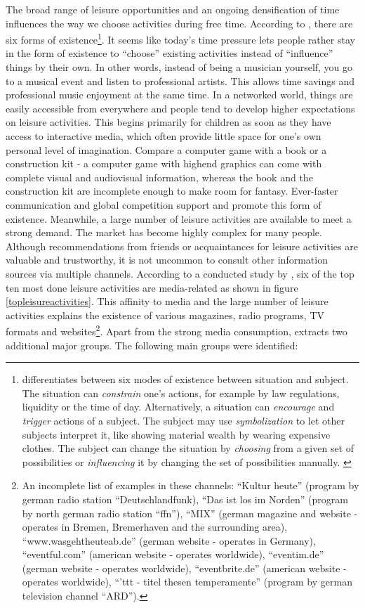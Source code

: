 \documentclass[12pt,numbers=noenddot,parskip,bibliography=totocnumbered,listof=totocnumbered,draft]{scrreprt}
\begin{document}
The broad range of leisure opportunities and an ongoing densification of time influences the way we choose activities during free time. According to \citeauthor{schulze2005}, there are six forms of existence\footnote{\citeauthor{schulze2005} differentiates between six modes of existence between situation and subject. The situation can \textit{constrain} one's actions, for example by law regulations, liquidity or the time of day. Alternatively, a situation can \textit{encourage} and \textit{trigger} actions of a subject. The subject may use \textit{symbolization} to let other subjects interpret it, like showing material wealth by wearing expensive clothes. The subject can change the situation by \textit{choosing} from a given set of possibilities or \textit{influencing} it by changing the set of possibilities manually. \citep[p. 198-206]{schulze2005}}. It seems like today's time pressure lets people rather stay in the form of existence to ``choose'' existing activities instead of ``influence'' things by their own. In other words, instead of being a musician yourself, you go to a musical event and listen to professional artists. This allows time savings and professional music enjoyment at the same time. In a networked world, things are easily accessible from everywhere and people tend to develop higher expectations on leisure activities. This begins primarily for children as soon as they have access to interactive media, which often provide little space for one's own personal level of imagination. Compare a computer game with a book or a construction kit - a computer game with highend graphics can come with complete visual and audiovisual information, whereas the book and the construction kit are incomplete enough to make room for fantasy. Ever-faster communication and global competition support and promote this form of existence. Meanwhile, a large number of leisure activities are available to meet a strong demand. The market has become highly complex for many people. Although recommendations from friends or acquaintances for leisure activities are valuable and trustworthy, it is not uncommon to consult other information sources via multiple channels. According to a conducted study by \citeauthor{freizeitmonitor2016}, six of the top ten most done leisure activities are media-related as shown in figure \ref{topleisureactivities}. This affinity to media and the large number of leisure activities explains the existence of various magazines, radio programs, TV formats and websites\footnote{An incomplete list of examples in these channels: ``Kultur heute'' (program by german radio station ``Deutschlandfunk), ``Das ist los im Norden'' (program by north german radio station ``ffn''), ``MIX'' (german magazine and website - operates in Bremen, Bremerhaven and the surrounding area), ``www.wasgehtheuteab.de'' (german website - operates in Germany), ``eventful.com'' (american website - operates worldwide), ``eventim.de'' (german website - operates worldwide), ``eventbrite.de'' (american website - operates worldwide), ``'ttt - titel thesen temperamente'' (program by german television channel ``ARD'').}. Apart from the strong media consumption, \citeauthor{freizeitmonitor2016} extracts two additional major groups. The following main groups were identified:
\end{document}
